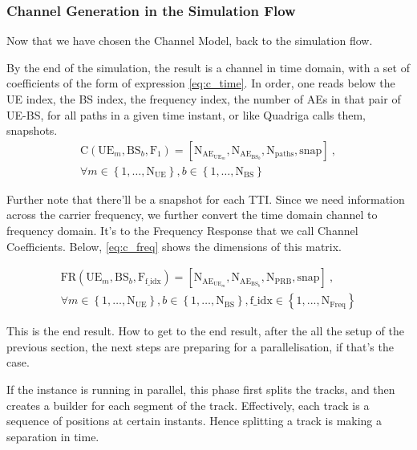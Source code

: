 \subsubsection*{Channel Generation in the Simulation Flow}

Now that we have chosen the Channel Model, back to the simulation flow.

By the end of the simulation, the result is a channel in time domain, with a set of coefficients of the form of expression \eqref{eq:c_time}. In order, one reads below the \acs{UE} index, the \acs{BS} index, the frequency index, the number of \acp{AE} in that pair of \acs{UE}-\acs{BS}, for all paths in a given time instant, or like Quadriga calls them, snapshots.
\begin{gather} \label{eq:c_time}
    \text{C}(\text{UE}_m, \text{BS}_b, \text{F}_1) = [\text{N}_{\text{AE}_{\text{UE}_m}}, \text{N}_{\text{AE}_{\text{BS}_b}}, \text{N}_\text{paths}, \text{snap}] \ , \\ 
    \forall m \in \left\{1, \dots, \text{N}_\text{UE}\right\}, b \in \left\{1, \dots, \text{N}_\text{BS}\right\} \nonumber
\end{gather}

Further note that there'll be a snapshot for each \acs{TTI}.
Since we need information across the carrier frequency, we further convert the time domain channel to frequency domain. It's to the Frequency Response that we call Channel Coefficients. Below, \eqref{eq:c_freq} shows the dimensions of this matrix. 

\begin{gather} \label{eq:c_freq}
    \text{FR}(\text{UE}_m, \text{BS}_b, \text{F}_\text{f\_idx}) = [\text{N}_{\text{AE}_{\text{UE}_m}}, \text{N}_{\text{AE}_{\text{BS}_b}}, \text{N}_\text{PRB}, \text{snap}] \ , \\
    \forall m \in \left\{1, \dots, \text{N}_\text{UE}\right\}, b \in \left\{1, \dots, \text{N}_\text{BS}\right\} \nonumber, \text{f\_idx} \in \left\{1, ..., \text{N}_\text{Freq} \right\}
\end{gather}


This is the end result. How to get to the end result, after the all the setup of the previous section, the next steps are preparing for a parallelisation, if that's the case.

If the instance is running in parallel, this phase first splits the tracks, and then creates a builder for each segment of the track. Effectively, each track is a sequence of positions at certain instants. Hence splitting a track is making a separation in time.



